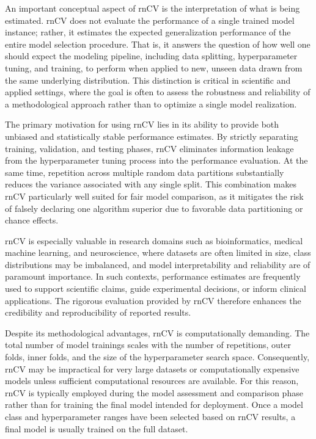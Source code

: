 \documentclass[en]{dimscthesis}
\begin{document}
An important conceptual aspect of rnCV is the interpretation of what is being estimated. rnCV does not evaluate the performance of a single trained model instance; rather, it estimates the expected generalization performance of the entire model selection procedure. That is, it answers the question of how well one should expect the modeling pipeline, including data splitting, hyperparameter tuning, and training, to perform when applied to new, unseen data drawn from the same underlying distribution. This distinction is critical in scientific and applied settings, where the goal is often to assess the robustness and reliability of a methodological approach rather than to optimize a single model realization.

The primary motivation for using rnCV lies in its ability to provide both unbiased and statistically stable performance estimates. By strictly separating training, validation, and testing phases, rnCV eliminates information leakage from the hyperparameter tuning process into the performance evaluation. At the same time, repetition across multiple random data partitions substantially reduces the variance associated with any single split. This combination makes rnCV particularly well suited for fair model comparison, as it mitigates the risk of falsely declaring one algorithm superior due to favorable data partitioning or chance effects.

rnCV is especially valuable in research domains such as bioinformatics, medical machine learning, and neuroscience, where datasets are often limited in size, class distributions may be imbalanced, and model interpretability and reliability are of paramount importance. In such contexts, performance estimates are frequently used to support scientific claims, guide experimental decisions, or inform clinical applications. The rigorous evaluation provided by rnCV therefore enhances the credibility and reproducibility of reported results.

Despite its methodological advantages, rnCV is computationally demanding. The total number of model trainings scales with the number of repetitions, outer folds, inner folds, and the size of the hyperparameter search space. Consequently, rnCV may be impractical for very large datasets or computationally expensive models unless sufficient computational resources are available. For this reason, rnCV is typically employed during the model assessment and comparison phase rather than for training the final model intended for deployment. Once a model class and hyperparameter ranges have been selected based on rnCV results, a final model is usually trained on the full dataset.
\end{document}
